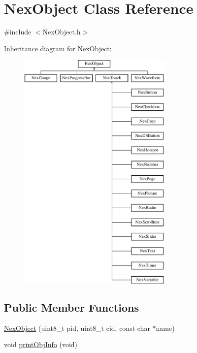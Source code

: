 \hypertarget{class_nex_object}{\section{Nex\+Object Class Reference}
\label{class_nex_object}
}


{\ttfamily \#include $<$Nex\+Object.\+h$>$}

Inheritance diagram for Nex\+Object\+:\begin{figure}[H]
\begin{center}
\leavevmode
\includegraphics[height=12.000000cm]{class_nex_object}
\end{center}
\end{figure}
\subsection*{Public Member Functions}
\begin{DoxyCompactItemize}
\item 
\hyperlink{class_nex_object_ab15aadb9c91d9690786d8d25d12d94e1}{Nex\+Object} (uint8\+\_\+t pid, uint8\+\_\+t cid, const char $\ast$name)
\item 
void \hyperlink{class_nex_object_abeff0c61474e8b3ce6bac76771820b64}{print\+Obj\+Info} (void)
\end{DoxyCompactItemize}
